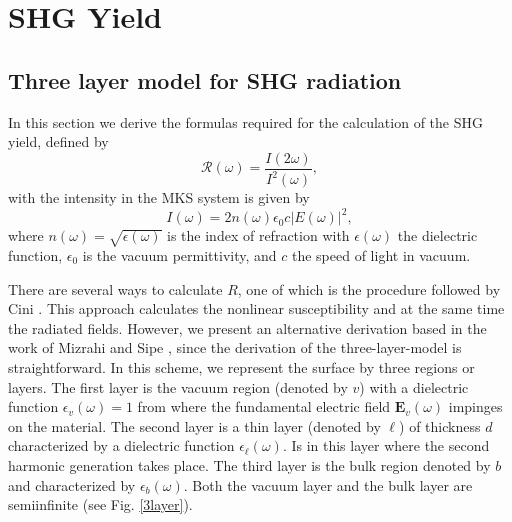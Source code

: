 \chapter{SHG Yield}
\minitoc

\section{Three layer model for SHG radiation}

In this section we derive the formulas required for the calculation of the SHG
yield, defined by
\begin{equation}\label{uno}
\mathcal{R}(\omega)=\frac{I(2\omega)}{I^2(\omega)}
,
\end{equation}
with the intensity in the MKS system is given by\cite{boyd}
\begin{equation}\label{dos}
I(\omega)=2n(\omega)\epsilon_{0}c|E(\omega)|^2,
\end{equation}
where $n(\omega)=\sqrt{\epsilon(\omega)}$ is the index of refraction with
$\epsilon(\omega)$ the dielectric function, $\epsilon_{0}$ is the vacuum permittivity,
and $c$ the speed of light in vacuum.

There are several ways to calculate $R$, one of which is the procedure followed
by Cini \cite{ciniPRB91}. This approach calculates the nonlinear susceptibility
and at the same time the radiated fields. However, we present an alternative
derivation based in the work of Mizrahi and Sipe \cite{mizrahiJOSA88}, since
the derivation of the three-layer-model is straightforward. 
In this scheme, 
we represent the surface by three regions or layers. The first layer
is the vacuum region (denoted by $v$) with a dielectric function $\epsilon_v(\omega)=1$ from
where the fundamental electric field $\mathbf{E}_{v}(\omega)$ impinges on the material. 
The second  layer is a thin layer (denoted by $\ell$) of thickness $d$ characterized
by a dielectric function $\epsilon_\ell(\omega)$. Is in this layer where the
second harmonic generation takes place. The third layer is the bulk
region denoted by $b$ and characterized by $\epsilon_b(\omega)$. 
Both the vacuum layer and the
bulk layer are semiinfinite  (see Fig. \ref{3layer}). 

